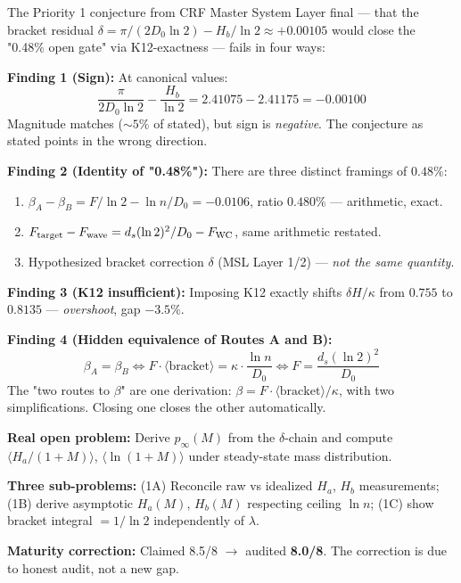 \documentclass[12pt, a4paper]{article}
\begin{document}
\begin{openqbox}[title={Audit Result: "0.48\% Open Gate" Correctly Identified (BracketCorrection v1--v3)}]
The Priority 1 conjecture from CRF Master System Layer final --- that the bracket residual $\delta = \pi/(2D_0\ln 2) - H_b/\ln 2 \approx +0.00105$ would close the "0.48\% open gate" via K12-exactness --- fails in four ways:

\textbf{Finding 1 (Sign):} At canonical values:
\[
  \frac{\pi}{2D_0\ln 2} - \frac{H_b}{\ln 2} = 2.41075 - 2.41175 = -0.00100
\]
Magnitude matches ($\sim 5\%$ of stated), but sign is \emph{negative}. The conjecture as stated points in the wrong direction.

\textbf{Finding 2 (Identity of "0.48\%"):} There are three distinct framings of $0.48\%$:
\begin{enumerate}
\item $\beta_A - \beta_B = F/\ln 2 - \ln n/D_0 = -0.0106$, ratio $0.480\%$ --- arithmetic, exact.
\item $F_{\rm target} - F_{\rm wave} = d_s(\ln 2)^2/D_0 - F_{\rm WC}$, same arithmetic restated.
\item Hypothesized bracket correction $\delta$ (MSL Layer 1/2) --- \emph{not the same quantity}.
\end{enumerate}

\textbf{Finding 3 (K12 insufficient):} Imposing K12 exactly shifts $\delta H/\kappa$ from $0.755$ to $0.8135$ --- \emph{overshoot}, gap $-3.5\%$.

\textbf{Finding 4 (Hidden equivalence of Routes A and B):}
\[
  \beta_A = \beta_B \iff F\cdot\langle\text{bracket}\rangle = \kappa\cdot\frac{\ln n}{D_0}
  \iff F = \frac{d_s(\ln 2)^2}{D_0}
\]
The "two routes to $\beta$" are one derivation: $\beta = F\cdot\langle\text{bracket}\rangle/\kappa$, with two simplifications. Closing one closes the other automatically.

\textbf{Real open problem:} Derive $p_\infty(M)$ from the $\delta$-chain and compute $\langle H_a/(1+M)\rangle$, $\langle\ln(1+M)\rangle$ under steady-state mass distribution.

\textbf{Three sub-problems:} (1A) Reconcile raw vs idealized $H_a$, $H_b$ measurements; (1B) derive asymptotic $H_a(M)$, $H_b(M)$ respecting ceiling $\ln n$; (1C) show bracket integral $= 1/\ln 2$ independently of $\lambda$.

\textbf{Maturity correction:} Claimed 8.5/8 $\to$ audited \textbf{8.0/8}. The correction is due to honest audit, not a new gap.
\end{openqbox}
\end{document}
